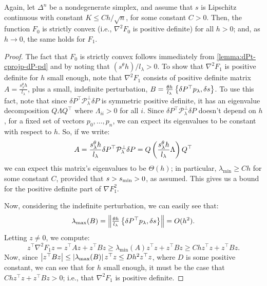 \documentclass[eikonal.tex]{subfiles}
\begin{document}
\begin{lemma}
  Again, let $\Delta^n$ be a nondegenerate simplex, and assume that
  $s$ is Lipschitz continuous with constant $K \leq Ch/\sqrt{n}$, for
  some constant $C > 0$. Then, the function $F_0$ is strictly convex
  (i.e., $\nabla^2 F_0$ is positive definite) for all $h > 0$; and, as
  $h \to 0$, the same holds for $F_1$.
\end{lemma}

\begin{proof}
  The fact that $F_0$ is strictly convex follows immediately from
  \cref{lemma:dPt-cprojp-dP-pd} and by noting that
  ${(s^\theta h)}/l_\lambda > 0$. To show that $\nabla^2 F_1$ is
  positive definite for $h$ small enough, note that $\nabla^2 F_1$
  consists of positive definite matrix
  $A = \frac{s^\theta_\lambda h}{l_\lambda}$, plus a small, indefinite
  perturbation,
  $B = \tfrac{\theta h}{l_\lambda} \left\{\delta P^\top p_\lambda,
    \delta s\right\}$. To use this fact, note that since
  $\delta P^\top \mathcal{P}^\perp_\lambda \delta P$ is symmetric
  positive definite, it has an eigenvalue decomposition
  $Q \Lambda Q^\top$ where $\Lambda_{ii} > 0$ for all $i$. Since
  $\delta P^\top \mathcal{P}^\perp_\lambda \delta P$ doesn't depend on
  $h$, for a fixed set of vectors $p_0, \hdots, p_n$, we can expect
  its eigenvalues to be constant with respect to $h$. So, if we write:
  \begin{equation}
    A = \frac{s^\theta_\lambda h}{l_\lambda} \delta P^\top \mathcal{P}^\perp_\lambda \delta P = Q \left(\frac{s^\theta_\lambda h}{l_\lambda} \Lambda\right) Q^\top
  \end{equation}
  we can expect this matrix's eigenvalues to be $\Theta(h)$; in
  particular, $\lambda_{\min} \geq C h$ for some constant $C$,
  provided that $s > s_{\operatorname{min}} > 0$, as assumed. This gives us a bound for
  the positive definite part of $\nabla F_1^2$.

  Now, considering the indefinite perturbation, we can easily see
  that:
  \begin{equation}
    \lambda_{\max}(B) = \left\|\tfrac{\theta h}{l_\lambda} \left\{\delta P^\top p_\lambda,
        \delta s\right\}\right\| = O(h^2).
  \end{equation}
  Letting $z \neq 0$, we compute:
  \begin{equation}
    z^\top \nabla^2 F_1 z = z^\top A z + z^\top B z \geq \lambda_{\min}(A) z^\top z + z^\top B z \geq Ch z^\top z + z^\top B z.
  \end{equation}
  Now, since
  $\left|z^\top B z\right| \leq \left|\lambda_{\max}(B)\right| z^\top z \leq D h^2
  z^\top z$, where $D$ is some positive constant, we can see that for
  $h$ small enough, it must be the case that
  $Ch z^\top z + z^\top B z > 0$; i.e., that $\nabla^2 F_1$ is
  positive definite.
\end{proof}
\end{document}
